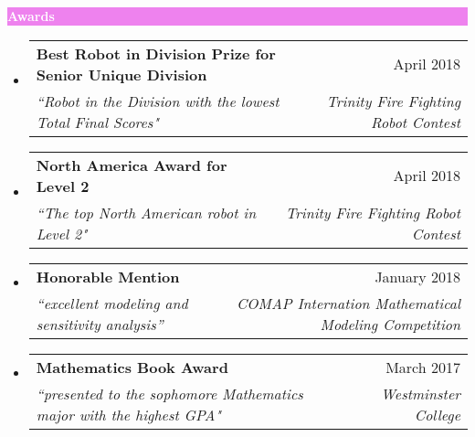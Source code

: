 \documentclass[letterpaper,11pt]{article}
\makeatletter
\newcommand{\resheading}[1]{{\large \colorbox{violet}{\begin{minipage}{\textwidth}{\textbf{#1 \vphantom{p\^{E}}}}\end{minipage}}}}
\newcommand{\ressubheading}[4]{
	\begin{tabular*}{7.0in}{l@{\extracolsep{\fill}}r}
		\textbf{#1} & #2 \\
		\textit{#3} & \textit{#4} \\
	\end{tabular*}\vspace{-6pt}}
\makeatother
\begin{document}
		\resheading{\textcolor{white}{Awards}}

		\begin{itemize}[topsep=3pt, itemsep=1pt]
			\item
			\ressubheading{Best Robot in Division Prize for Senior Unique Division}{April 2018}{``Robot in the Division with the lowest Total Final Scores"}{Trinity Fire Fighting Robot Contest}
			\item
			\ressubheading{North America Award for Level 2}{April 2018}{``The top North American robot in Level 2"}{Trinity Fire Fighting Robot Contest}
			\item
			\ressubheading{Honorable Mention}{January 2018}{``excellent modeling and sensitivity analysis''}{COMAP Internation Mathematical Modeling Competition}
			\item
			\ressubheading{Mathematics Book Award}{March 2017}{``presented to the sophomore Mathematics major with the highest GPA"}{Westminster College}
		\end{itemize}
\end{document}
